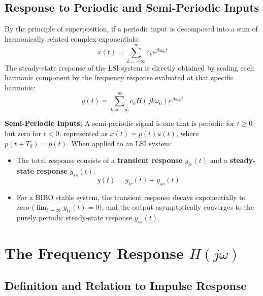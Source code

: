 \documentclass[12pt,a4paper]{article}
\begin{document}
\subsection{Response to Periodic and Semi-Periodic Inputs}
By the principle of superposition, if a periodic input is decomposed into a sum of harmonically related complex exponentials:
\begin{equation}
  x(t) = \sum_{k=-\infty}^{\infty} c_k e^{j k \omega_0 t}
\end{equation}
The steady-state response of the LSI system is directly obtained by scaling each harmonic component by the frequency response evaluated at that specific harmonic:
\begin{equation}
  y(t) = \sum_{k=-\infty}^{\infty} c_k H(j k \omega_0) e^{j k \omega_0 t}
\end{equation}

\textbf{Semi-Periodic Inputs:}
A semi-periodic signal is one that is periodic for $t \ge 0$ but zero for $t < 0$, represented as $x(t) = p(t) u(t)$, where $p(t + T_0) = p(t)$. When applied to an LSI system:
\begin{itemize}[topsep=2pt, itemsep=2pt]
  \item The total response consists of a \textbf{transient response} $y_{tr}(t)$ and a \textbf{steady-state response} $y_{ss}(t)$:
  \begin{equation}
    y(t) = y_{tr}(t) + y_{ss}(t)
  \end{equation}
  \item For a BIBO stable system, the transient response decays exponentially to zero ($\lim_{t\to\infty} y_{tr}(t) = 0$), and the output asymptotically converges to the purely periodic steady-state response $y_{ss}(t)$.
\end{itemize}

\section{The Frequency Response \texorpdfstring{$H(j\omega)$}{H(j omega)}}

\subsection{Definition and Relation to Impulse Response}
\end{document}
